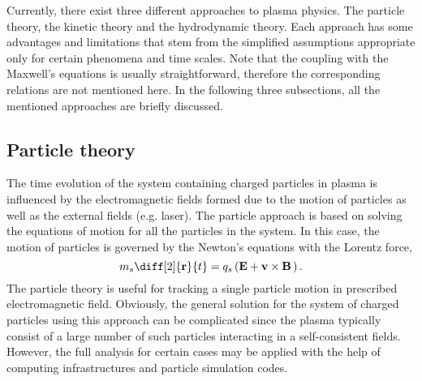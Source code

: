Currently, there exist three different approaches to plasma physics. The particle theory, the kinetic theory and the hydrodynamic theory. Each approach has some advantages and limitations that stem from the simplified assumptions appropriate only for certain phenomena and time scales. Note that the coupling with the Maxwell's equations is usually straightforward, therefore the corresponding relations are not mentioned here. In the following three subsections, all the mentioned approaches are briefly discussed. 

\subsection{Particle theory}
The time evolution of the system containing charged particles in plasma is influenced by the electromagnetic fields formed due to the motion of particles as well as the external fields (e.g. laser). The particle approach is based on solving the equations of motion for all the particles in the system. In this case, the motion of particles is governed by the Newton's equations with the Lorentz force,
\begin{equation}
\label{2.2.5}
m_s \diff[2]{\vec{r}}{t} = q_s \left(\vec{E} + \vec{v} \times \vec{B} \, \right).
\end{equation}
The particle theory is useful for tracking a single particle motion in prescribed electromagnetic field. Obviously, the general solution for the system of charged particles using this approach can be complicated since the plasma typically consist of a large number of such particles interacting in a self-consistent fields. However, the full analysis for certain cases may be applied with the help of computing infrastructures and particle simulation codes.


